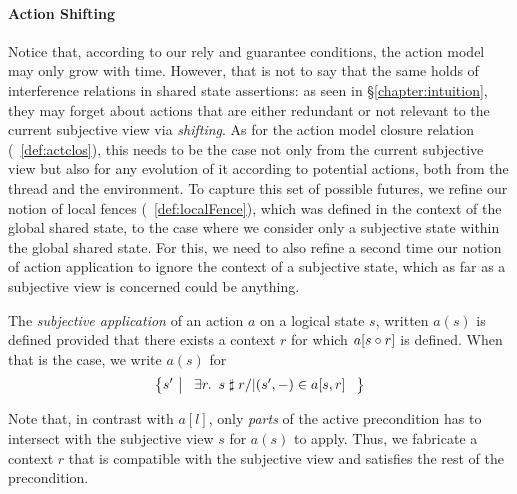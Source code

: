 \paragraph{Action Shifting}
Notice that, according to our rely and guarantee conditions, the action model may only grow with time. However, that is not to say that the same holds of interference relations in shared state assertions: as seen in \S\ref{chapter:intuition}, they may forget about actions that are either redundant or not relevant to the current subjective view via \emph{shifting}. As for the action model closure relation (~\ref{def:actclos}), this needs to be the case not only from the current subjective view but also for any evolution of it according to potential actions, both from the thread and the environment. To capture this set of possible futures, we refine our notion of local fences (~\ref{def:localFence}), which was defined in the context of the global shared state, to the case where we consider only a subjective state within the global shared state.
For this, we need to also refine a second time our notion of action application to ignore the context of a subjective state, which as far as a subjective view is concerned could be anything.
%
%
\begin{definition}
The \emph{subjective application} of an action $a$ on a logical state $s$, written $a(s)$ is defined provided that there exists a context $r$ for which $a[s \circ r]$ is defined. When that is the case, we write $a(s)$ for
%
\[
  \left\{ s' \ \middle|\ 
  \begin{array}{l}
		\exsts{r}\
  	s \compatible r /| (s', -) \in a[s, r]
  \end{array}\; \right\}
\]
%
\end{definition}
%
%
Note that, in contrast with $a[l]$, only \emph{parts} of the active precondition has to intersect with the subjective view $s$ for $a(s)$ to apply. Thus, we fabricate a context $r$ that is compatible with the subjective view and satisfies the rest of the precondition. 


